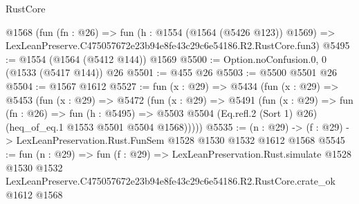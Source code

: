\begin{lexlean}{RustCore}
\begin{coremodule}
    @1568
    (fun (fn : @26) =>
    fun (h : @1554 (@1564 (@5426 @123)) @1569) =>
    LexLeanPreserve.C475057672e23b94e8fe43c29c6e54186.R2.RustCore.fun3)
@5495 := @1554 (@1564 (@5412 @144)) @1569
@5500 := Option.noConfusion.{0, 0} (@1533 (@5417 @144)) @26
@5501 := @455 @26
@5503 := @5500 @5501 @26
@5504 := @1567 @1612
@5527 := fun (x : @29) =>
  @5434
    (fun (x : @29) =>
    @5453
      (fun (x : @29) =>
      @5472
        (fun (x : @29) =>
        @5491
          (fun (x : @29) =>
          fun (fn : @26) =>
          fun (h : @5495) =>
          @5503 @5504 (Eq.refl.{2} (Sort 1) @26) (heq_of_eq.{1} @1553 @5501 @5504 @1568)))))
@5535 := (n : @29) -> (f : @29) -> LexLeanPreservation.Rust.FunSem @1528 @1530 @1532 @1612 @1568
@5545 := fun (n : @29) =>
  fun (f : @29) =>
  LexLeanPreservation.Rust.simulate
    @1528
    @1530
    @1532
    LexLeanPreserve.C475057672e23b94e8fe43c29c6e54186.R2.RustCore.crate_ok
    @1612
    @1568
\end{coremodule}
\end{lexlean}
